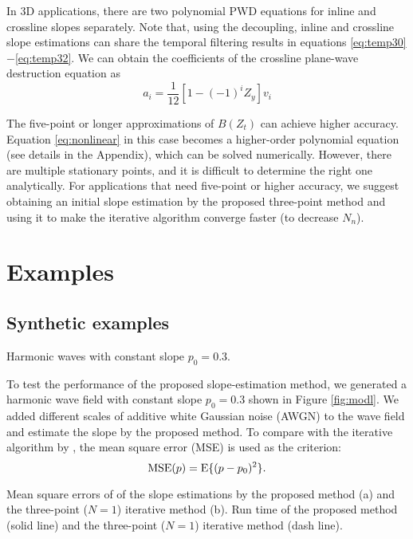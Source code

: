 In 3D applications, there are two polynomial PWD equations 
for inline and crossline slopes separately.
Note that, using the decoupling,
inline and crossline slope estimations can share
the temporal filtering results in equations \ref{eq:temp30}$-$\ref{eq:temp32}.
We can obtain the coefficients of the crossline 
plane-wave destruction equation as
\begin{equation}
a_i=\frac{1}{12}[1-(-1)^iZ_y]v_i
\end{equation}

The five-point or longer approximations of \mbox{$B(Z_t)$} 
can achieve higher accuracy.
Equation \ref{eq:nonlinear} in this case becomes 
a higher-order polynomial equation (see details in the Appendix),
which can be solved numerically.
However, there are multiple stationary points, 
and it is difficult to determine the right one analytically.
For applications that need five-point or higher accuracy,
we suggest obtaining an initial slope estimation by
the proposed three-point method and 
using it to make the iterative algorithm converge faster 
(to decrease \mbox{$N_n$}).

\section{Examples}

\subsection{Synthetic examples}
{Harmonic waves with constant slope $p_0=0.3$.}

To test the performance of the proposed slope-estimation method,
we generated a harmonic wave field with constant slope $p_0=0.3$
shown in Figure \ref{fig:modl}.
We added different scales of additive white Gaussian noise (AWGN) 
to the wave field and estimate the slope by the proposed method.
To compare with the iterative algorithm by \cite{fomel:1946},
the mean square error (MSE) is used as the criterion:
\begin{equation}
\textrm{MSE}(p)=\textrm E\{(p-p_0)^2\}.
\end{equation}

{Mean square errors of of the slope estimations by 
the proposed method (a) and the three-point ($N=1$) iterative method (b).
}
{
Run time of the proposed method (solid line)
and the three-point ($N=1$) iterative method (dash line).
}

